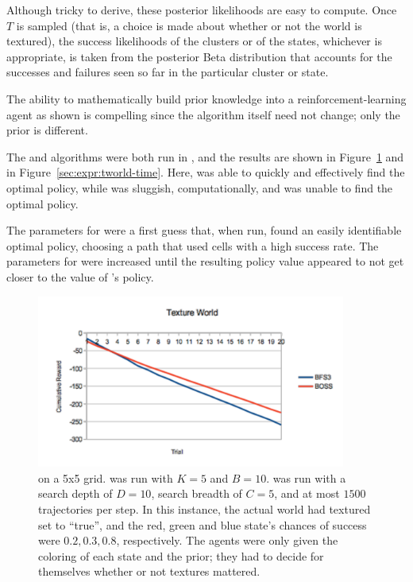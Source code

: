 Although tricky to derive, these posterior likelihoods are easy to compute. Once $T$ is sampled (that is, a choice is made about whether or not the world is textured), the success likelihoods of the clusters or of the states, whichever is appropriate, is taken from the posterior Beta distribution that accounts for the successes and failures seen so far in the particular cluster or state.

The ability to mathematically build prior knowledge into a reinforcement-learning agent as shown is compelling since the algorithm itself need not change; only the prior is different.

The  and  algorithms were both run in , and the results are shown in Figure~\ref{sec:expr:tworld-reward} and in Figure~\ref{sec:expr:tworld-time}. Here,  was able to quickly and effectively find the optimal policy, while  was sluggish, computationally, and was unable to find the optimal policy.

The parameters for  were a first guess that, when run, found an easily identifiable optimal policy, choosing a path that used cells with a high success rate. The parameters for  were increased until the resulting policy value appeared to not get closer to the value of 's policy.

\begin{figure}
\vskip 0.2in
\begin{center}
\centerline{\includegraphics[width=4in]{figures/tworld-reward}}
\caption{
 on a 5x5 grid.  was run with $K=5$ and $B=10$.  was run with a search depth of $D=10$, search breadth of $C=5$, and at most $1500$ trajectories per step. In this instance, the actual world had textured set to ``true'', and the red, green and blue state's chances of success were $0.2, 0.3, 0.8$, respectively. The agents were only given the coloring of each state and the prior; they had to decide for themselves whether or not textures mattered.
}
\label{sec:expr:tworld-reward}
\end{center}
\vskip -0.2in
\end{figure} 


